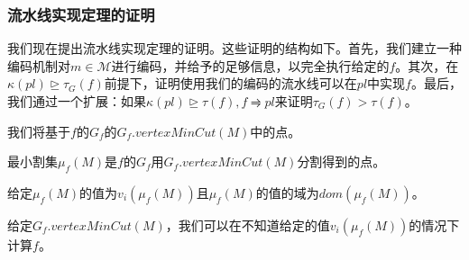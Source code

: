 \subsubsection{流水线实现定理的证明}

我们现在提出流水线实现定理的证明。这些证明的结构如下。首先，我们建立一种编码机制对$m \in \mathcal{M}$进行编码，并给予的足够信息，以完全执行给定的$f$。其次，在$\kappa(pl) \trianglerighteq \tau_G(f)$前提下，证明使用我们的编码的流水线可以在$pl$中实现$f$。最后，我们通过一个扩展：如果$\kappa(pl) \trianglerighteq \tau(f), f \rightrightharpoons pl$来证明$\tau_G(f) > \tau(f)$。

我们将基于$f$的$G_f$的$G_f.vertexMinCut(M)$中的点。

\begin{definition}
最小割集$\mu_f(M)$是$f$的$G_f$用$G_f.vertexMinCut(M)$分割得到的点。
\end{definition}

给定$\mu_f(M)$的值为$v_i(\mu_f(M))$且$\mu_f(M)$的值的域为$dom(\mu_f(M))$。 %

\begin{lemma}
\label{lemma:M-to-mu}
给定$G_f.vertexMinCut(M)$，我们可以在不知道给定的值$v_i(\mu_f(M))$的情况下计算$f$。
\end{lemma}





